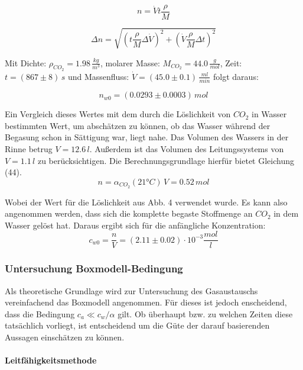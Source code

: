 \documentclass[12pt]{article}
\begin{document}
\begin{equation}
n = \dot V t \frac{\rho}{M}
\end{equation}

\begin{equation}
\Delta n = \sqrt{(t \frac{\rho}{M} \Delta \dot V)^{2}+(\dot V \frac{\rho}{M} \Delta t)^{2}}
\end{equation}

Mit Dichte: $\rho_{CO_2} = 1.98 \,\frac{kg}{m^3} $, molarer Masse: $M_{CO_2} = 44.0\,\frac{g}{mol} $, Zeit:  $t = (867 \pm 8) \, s$ und Massenfluss: $\dot V = (45.0 \pm 0.1)\,\frac{ml}{min}$ folgt daraus:

\begin{equation}
n_{w0} = (0.0293 \pm 0.0003) \,mol
\end{equation}

Ein Vergleich dieses Wertes mit dem durch die Löslichkeit von $CO_2$ in Wasser bestimmten Wert, um absch\"atzen zu können, ob das Wasser w\"ahrend der Begasung schon in S\"attigung war, liegt nahe. Das Volumen des Wassers in der Rinne betrug $V = 12.6 \,l $. Außerdem ist das Volumen des Leitungssystems von $V=1.1 \,l $ zu ber\"ucksichtigen. Die Berechnungsgrundlage hierfür bietet \cite{jaehne} Gleichung (44).
\begin{equation}
n = \alpha_{CO_2}(21 °C) \, V = 0.52 \, mol
\end{equation}

Wobei der Wert für die L\"oslichkeit aus \cite{jaehne} Abb. 4 verwendet wurde. Es kann also angenommen werden, dass sich die komplette begaste Stoffmenge an $CO_2$ in dem Wasser gelöst hat. Daraus ergibt sich für die anfängliche Konzentration:
\begin{equation}
c_{w0} = \frac{n}{V} = (2.11 \pm 0.02)\cdot 10^{-3} \frac{mol}{l}
\end{equation}

\subsubsection{Untersuchung Boxmodell-Bedingung}

Als theoretische Grundlage wird zur Untersuchung des Gasaustauschs vereinfachend das Boxmodell angenommen. Für dieses ist jedoch enscheidend, dass die Bedingung
$c_a \ll c_w/\alpha $ gilt. Ob überhaupt bzw. zu welchen Zeiten diese tatsächlich vorliegt, ist entscheidend um die Güte der darauf basierenden Aussagen einschätzen zu können.

\paragraph{Leitfähigkeitsmethode\\}
\end{document}
